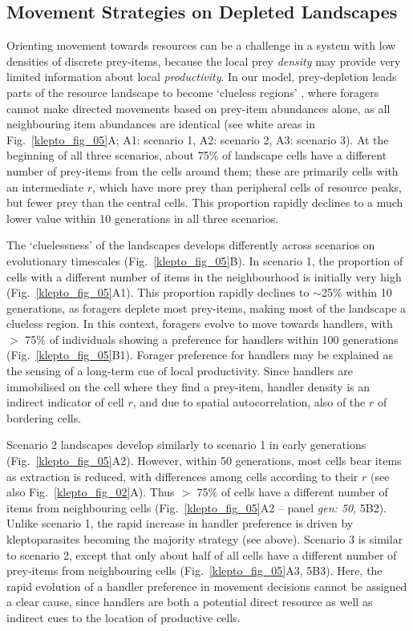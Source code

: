\subsection*{Movement Strategies on Depleted Landscapes}

Orienting movement towards resources \parencite[][\textit{where to move}]{nathan2008a} can be a challenge in a system with low densities of discrete prey-items, because the local prey \textit{density} may provide very limited information about local \textit{productivity}.
In our model, prey-depletion leads parts of the resource landscape to become `clueless regions' \parencite{perkins1992}, where foragers cannot make directed movements based on prey-item abundances alone, as all neighbouring item abundances are identical (see white areas in Fig.~\ref{klepto_fig_05}A; A1: scenario 1, A2: scenario 2, A3: scenario 3).
At the beginning of all three scenarios, about 75\% of landscape cells have a different number of prey-items from the cells around them; these are primarily cells with an intermediate $r$, which have more prey than peripheral cells of resource peaks, but fewer prey than the central cells.
This proportion rapidly declines to a much lower value within 10 generations in all three scenarios.

The `cluelessness' of the landscapes develops differently across scenarios on evolutionary timescales (Fig.~\ref{klepto_fig_05}B).
In scenario 1, the proportion of cells with a different number of items in the neighbourhood is initially very high (Fig.~\ref{klepto_fig_05}A1).
This proportion rapidly declines to $\sim$25\% within 10 generations, as foragers deplete most prey-items, making most of the landscape a clueless region.
In this context, foragers evolve to move towards handlers, with $>$ 75\% of individuals showing a preference for handlers within 100 generations (Fig.~\ref{klepto_fig_05}B1).
Forager preference for handlers may be explained as the sensing of a long-term cue of local productivity.
Since handlers are immobilised on the cell where they find a prey-item, handler density is an indirect indicator of cell $r$, and due to spatial autocorrelation, also of the $r$ of bordering cells.

Scenario 2 landscapes develop similarly to scenario 1 in early generations (Fig.~\ref{klepto_fig_05}A2).
However, within 50 generations, most cells bear items as extraction is reduced, with differences among cells according to their $r$ (see also Fig.~\ref{klepto_fig_02}A).
Thus $>$ 75\% of cells have a different number of items from neighbouring cells (Fig.~\ref{klepto_fig_05}A2 -- panel \textit{gen: 50}, 5B2).
Unlike scenario 1, the rapid increase in handler preference is driven by kleptoparasites becoming the majority strategy (see above).
Scenario 3 is similar to scenario 2, except that only about half of all cells have a different number of prey-items from neighbouring cells (Fig.~\ref{klepto_fig_05}A3, 5B3).
Here, the rapid evolution of a handler preference in movement decisions cannot be assigned a clear cause, since handlers are both a potential direct resource as well as indirect cues to the location of productive cells.

